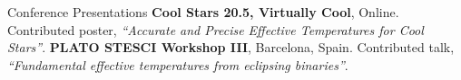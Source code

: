 \begin{rubric}{Conference Presentations}
\entry*[2021]%
	\textbf{Cool Stars 20.5, Virtually Cool}, Online. Contributed poster, \textit{``Accurate and Precise Effective Temperatures for Cool Stars''}. 
\entry*[2019]%
	\textbf{PLATO STESCI Workshop III}, Barcelona, Spain. Contributed talk, \textit{``Fundamental effective temperatures from eclipsing binaries''}.  
%
%
%
%
\end{rubric}